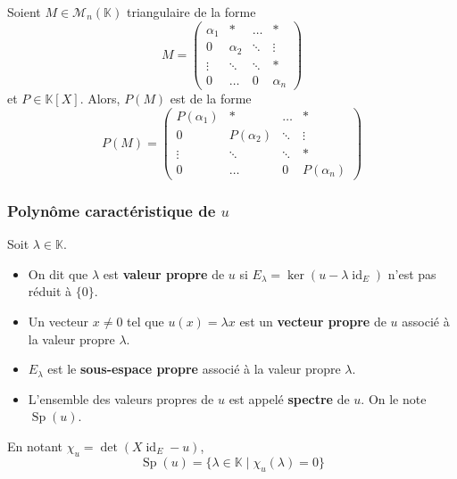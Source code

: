   \begin{proposition}
    Soient $M \in \mathcal{M}_n(\mathbb{K})$ triangulaire de la forme
    \[
      M = \begin{pmatrix}
        \alpha_1 & * & \dots & * \\
        0 & \alpha_2 & \ddots & \vdots \\
        \vdots & \ddots & \ddots & * \\
        0 & \dots & 0 & \alpha_n
      \end{pmatrix}
    \]
    et $P \in \mathbb{K}[X]$. Alors, $P(M)$ est de la forme
    \[
    P(M) = \begin{pmatrix}
      P(\alpha_1) & * & \dots & * \\
      0 & P(\alpha_2) & \ddots & \vdots \\
      \vdots & \ddots & \ddots & * \\
      0 & \dots & 0 & P(\alpha_n)
    \end{pmatrix}
    \]
  \end{proposition}

  \subsubsection{Polynôme caractéristique de \texorpdfstring{$u$}{u}}


  \begin{definition}
    \label{150-1}
    Soit $\lambda \in \mathbb{K}$.
    \begin{itemize}
      \item On dit que $\lambda$ est \textbf{valeur propre} de $u$ si $E_\lambda = \ker(u - \lambda \operatorname{id}_E)$ n'est pas réduit à $\{ 0 \}$.
      \item Un vecteur $x \neq 0$ tel que $u(x) = \lambda x$ est un \textbf{vecteur propre} de $u$ associé à la valeur propre $\lambda$.
      \item $E_\lambda$ est le \textbf{sous-espace propre} associé à la valeur propre $\lambda$.
      \item L'ensemble des valeurs propres de $u$ est appelé \textbf{spectre} de $u$. On le note $\operatorname{Sp}(u)$.
    \end{itemize}
  \end{definition}

  \begin{proposition}
    En notant $\chi_u = \det(X \operatorname{id}_E - u)$,
    \[ \operatorname{Sp}(u) = \{ \lambda \in \mathbb{K} \mid \chi_u(\lambda) = 0 \} \]
  \end{proposition}

